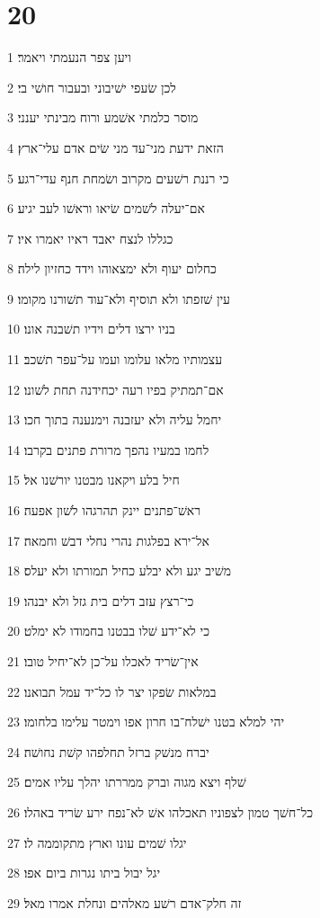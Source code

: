\chapter{20}

\par 1 ויען צפר הנעמתי ויאמר׃
\par 2 לכן שׂעפי ישׁיבוני ובעבור חושׁי בי׃
\par 3 מוסר כלמתי אשׁמע ורוח מבינתי יענני׃
\par 4 הזאת ידעת מני־עד מני שׂים אדם עלי־ארץ׃
\par 5 כי רננת רשׁעים מקרוב ושׂמחת חנף עדי־רגע׃
\par 6 אם־יעלה לשׁמים שׂיאו וראשׁו לעב יגיע׃
\par 7 כגללו לנצח יאבד ראיו יאמרו איו׃
\par 8 כחלום יעוף ולא ימצאוהו וידד כחזיון לילה׃
\par 9 עין שׁזפתו ולא תוסיף ולא־עוד תשׁורנו מקומו׃
\par 10 בניו ירצו דלים וידיו תשׁבנה אונו׃
\par 11 עצמותיו מלאו עלומו ועמו על־עפר תשׁכב׃
\par 12 אם־תמתיק בפיו רעה יכחידנה תחת לשׁונו׃
\par 13 יחמל עליה ולא יעזבנה וימנענה בתוך חכו׃
\par 14 לחמו במעיו נהפך מרורת פתנים בקרבו׃
\par 15 חיל בלע ויקאנו מבטנו יורשׁנו אל׃
\par 16 ראשׁ־פתנים יינק תהרגהו לשׁון אפעה׃
\par 17 אל־ירא בפלגות נהרי נחלי דבשׁ וחמאה׃
\par 18 משׁיב יגע ולא יבלע כחיל תמורתו ולא יעלס׃
\par 19 כי־רצץ עזב דלים בית גזל ולא יבנהו׃
\par 20 כי לא־ידע שׁלו בבטנו בחמודו לא ימלט׃
\par 21 אין־שׂריד לאכלו על־כן לא־יחיל טובו׃
\par 22 במלאות שׂפקו יצר לו כל־יד עמל תבואנו׃
\par 23 יהי למלא בטנו ישׁלח־בו חרון אפו וימטר עלימו בלחומו׃
\par 24 יברח מנשׁק ברזל תחלפהו קשׁת נחושׁה׃
\par 25 שׁלף ויצא מגוה וברק ממררתו יהלך עליו אמים׃
\par 26 כל־חשׁך טמון לצפוניו תאכלהו אשׁ לא־נפח ירע שׂריד באהלו׃
\par 27 יגלו שׁמים עונו וארץ מתקוממה לו׃
\par 28 יגל יבול ביתו נגרות ביום אפו׃
\par 29 זה חלק־אדם רשׁע מאלהים ונחלת אמרו מאל׃

